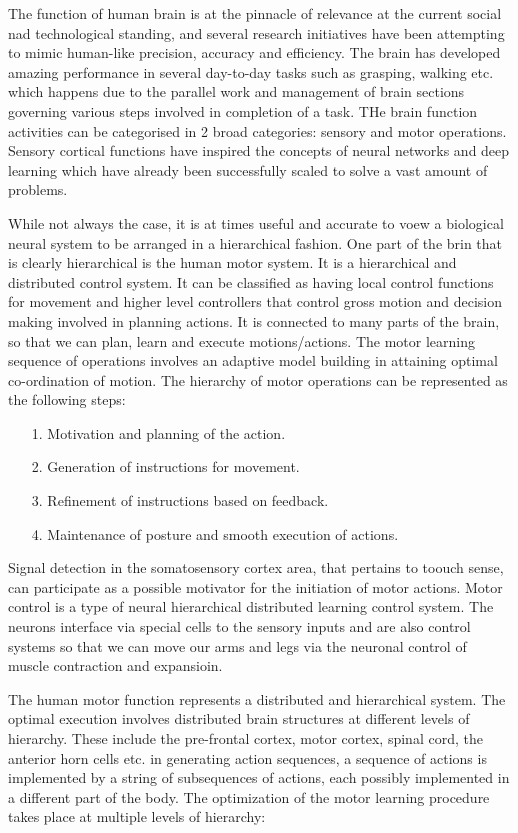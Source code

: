 \documentclass[conference]{IEEEtran}
\begin{document}
The function of human brain is at the pinnacle of relevance at the current social nad technological standing, and several research initiatives have been attempting to mimic human-like precision, accuracy and efficiency. The brain has developed amazing performance in several day-to-day tasks such as grasping, walking etc. which happens due to the parallel work and management of brain sections governing various steps involved in completion of a task. THe brain function activities can be categorised in 2 broad categories: sensory and motor operations. Sensory cortical functions have inspired the concepts of neural networks and deep learning which have already been successfully scaled to solve a vast amount of problems.

While not always the case, it is at times useful and accurate to voew a biological neural system to be arranged in a hierarchical fashion. One part of the brin that is clearly hierarchical is the human motor system. It is a hierarchical and distributed control system. It can be classified as having local control functions for movement and higher level controllers that control gross motion and decision making involved in planning actions. It is connected to many parts of the brain, so that we can plan, learn and execute motions/actions. The motor learning sequence of operations involves an adaptive model building in attaining optimal co-ordination of motion. The hierarchy of motor operations can be represented as the following steps:
\begin{itemize}
	\item[1.] Motivation and planning of the action.
	\item[2.] Generation of instructions for movement.
	\item[3.] Refinement of instructions based on feedback.
	\item[4.] Maintenance of posture and smooth execution of actions.
\end{itemize}

Signal detection in the somatosensory cortex area, that pertains to toouch sense, can participate as a possible motivator for the initiation of motor actions. Motor control is a type of neural hierarchical distributed learning control system. The neurons interface via special cells to the sensory inputs and are also control systems so that we can move our arms and legs via the neuronal control of muscle contraction and expansioin.

The human motor function represents a distributed and hierarchical system. The optimal execution involves distributed brain structures at different levels of hierarchy. These include the pre-frontal cortex, motor cortex, spinal cord, the anterior horn cells etc. in generating action sequences, a sequence of actions is implemented by a string of subsequences of actions, each possibly implemented in a different part of the body. The optimization of the motor learning procedure takes place at multiple levels of hierarchy:
\end{document}
